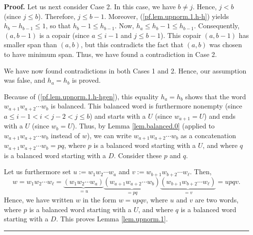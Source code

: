 \documentclass[numbers=enddot,12pt,final,onecolumn,notitlepage]{scrartcl}%
\theoremstyle{definition}
\newenvironment{proof}[1][Proof]{\noindent\textbf{#1.} }{\ \rule{0.5em}{0.5em}}
\newenvironment{verlong}{}{}
\begin{document}
\begin{verlong}
\begin{proof}
Let us next consider Case 2. In this case, we have $b\neq j$. Hence, $j<b$
(since $j\leq b$). Therefore, $j\leq b-1$. Moreover,
(\ref{pf.lem.upnorm.1.h-h}) yields $h_{b}-h_{b-1}\leq1$, so that $h_{b}-1\leq
h_{b-1}$. Now, $h_{a}\leq h_{b}-1\leq h_{b-1}$. Consequently, $\left(
a,b-1\right)  $ is a copair (since $a\leq i-1$ and $j\leq b-1$). This copair
$\left(  a,b-1\right)  $ has smaller span than $\left(  a,b\right)  $, but
this contradicts the fact that $\left(  a,b\right)  $ was chosen to have
minimum span. Thus, we have found a contradiction in Case 2.

We have now found contradictions in both Cases 1 and 2. Hence, our assumption
was false, and $h_{a}=h_{b}$ is proved.

Because of (\ref{pf.lem.upnorm.1.h-hgen}), this equality $h_{a}=h_{b}$ shows
that the word $w_{a+1}w_{a+2}\cdots w_{b}$ is balanced.
This balanced word is
furthermore nonempty (since $a \leq i-1 < i < j-2 < j \leq b$)
and starts with a $U$ (since $w_{a+1}=U$) and ends with a $U$ (since
$w_{b}=U$). Thus, by Lemma \ref{lem.balanced.0} (applied to $w_{a+1}%
w_{a+2}\cdots w_{b}$ instead of $w$), we can write $w_{a+1}w_{a+2}\cdots
w_{b}$ as a concatenation $w_{a+1}w_{a+2}\cdots w_{b}=pq$, where $p$ is a
balanced word starting with a $U$, and where $q$ is a balanced word starting
with a $D$. Consider these $p$ and $q$.

Let us furthermore set $u:=w_{1}w_{2}\cdots w_{a}$ and $v:=w_{b+1}%
w_{b+2}\cdots w_{\ell}$. Then,%
\[
w = w_1 w_2 \cdots w_\ell = \underbrace{\left(  w_{1}w_{2}\cdots w_{a}\right)  }_{=u}\underbrace{\left(
w_{a+1}w_{a+2}\cdots w_{b}\right)  }_{=pq}\underbrace{\left(  w_{b+1}%
w_{b+2}\cdots w_{\ell}\right)  }_{=v}=upqv.
\]
Hence, we have written $w$ in the form $w=upqv$, where $u$ and $v$ are two
words, where $p$ is a balanced word starting with a $U$, and where $q$ is a
balanced word starting with a $D$. This proves Lemma \ref{lem.upnorm.1}.
\end{proof}
\end{verlong}
\end{document}
